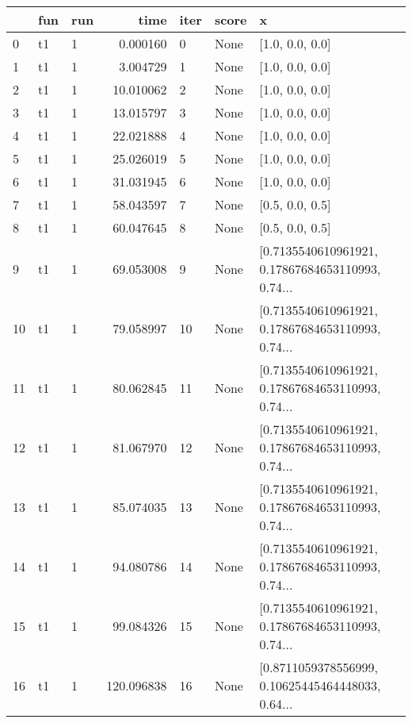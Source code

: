 \begin{tabular}{lllrlll}
\toprule
{} & fun & run &        time & iter & score &                                                  x \\
\midrule
0   &  t1 &   1 &    0.000160 &    0 &  None &                                    [1.0, 0.0, 0.0] \\
1   &  t1 &   1 &    3.004729 &    1 &  None &                                    [1.0, 0.0, 0.0] \\
2   &  t1 &   1 &   10.010062 &    2 &  None &                                    [1.0, 0.0, 0.0] \\
3   &  t1 &   1 &   13.015797 &    3 &  None &                                    [1.0, 0.0, 0.0] \\
4   &  t1 &   1 &   22.021888 &    4 &  None &                                    [1.0, 0.0, 0.0] \\
5   &  t1 &   1 &   25.026019 &    5 &  None &                                    [1.0, 0.0, 0.0] \\
6   &  t1 &   1 &   31.031945 &    6 &  None &                                    [1.0, 0.0, 0.0] \\
7   &  t1 &   1 &   58.043597 &    7 &  None &                                    [0.5, 0.0, 0.5] \\
8   &  t1 &   1 &   60.047645 &    8 &  None &                                    [0.5, 0.0, 0.5] \\
9   &  t1 &   1 &   69.053008 &    9 &  None &  [0.7135540610961921, 0.17867684653110993, 0.74... \\
10  &  t1 &   1 &   79.058997 &   10 &  None &  [0.7135540610961921, 0.17867684653110993, 0.74... \\
11  &  t1 &   1 &   80.062845 &   11 &  None &  [0.7135540610961921, 0.17867684653110993, 0.74... \\
12  &  t1 &   1 &   81.067970 &   12 &  None &  [0.7135540610961921, 0.17867684653110993, 0.74... \\
13  &  t1 &   1 &   85.074035 &   13 &  None &  [0.7135540610961921, 0.17867684653110993, 0.74... \\
14  &  t1 &   1 &   94.080786 &   14 &  None &  [0.7135540610961921, 0.17867684653110993, 0.74... \\
15  &  t1 &   1 &   99.084326 &   15 &  None &  [0.7135540610961921, 0.17867684653110993, 0.74... \\
16  &  t1 &   1 &  120.096838 &   16 &  None &  [0.8711059378556999, 0.10625445464448033, 0.64... \\

\end{tabular}
